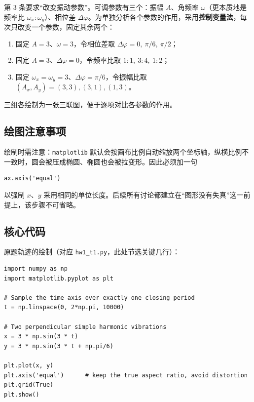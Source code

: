 \documentclass[UTF8,a4paper,12pt]{ctexart}
\begin{document}
第 3 条要求“改变振动参数”。可调参数有三个：振幅 $A$、角频率 $\omega$（更本质地是频率比 $\omega_x:\omega_y$）、相位差 $\Delta\varphi$。为单独分析各个参数的作用，采用\textbf{控制变量法}，每次只改变一个参数，固定其余两个：

\begin{enumerate}
  \item 固定 $A=3$、$\omega=3$，令相位差取 $\Delta\varphi = 0,\ \pi/6,\ \pi/2$；
  \item 固定 $A=3$、$\Delta\varphi=0$，令频率比取 $1{:}1,\ 3{:}4,\ 1{:}2$；
  \item 固定 $\omega_x=\omega_y=3$、$\Delta\varphi=\pi/6$，令振幅比取 $(A_x,A_y)=(3,3),(3,1),(1,3)$。
\end{enumerate}

三组各绘制为一张三联图，便于逐项对比各参数的作用。

\subsection{绘图注意事项}

绘制时需注意：\texttt{matplotlib} 默认会按画布比例自动缩放两个坐标轴，纵横比例不一致时，圆会被压成椭圆、椭圆也会被拉变形。因此必须加一句

\begin{lstlisting}
ax.axis('equal')
\end{lstlisting}

以强制 $x$、$y$ 采用相同的单位长度。后续所有讨论都建立在“图形没有失真”这一前提上，该步骤不可省略。

\subsection{核心代码}

原题轨迹的绘制（对应 \texttt{hw1\_t1.py}，此处节选关键几行）：

\begin{lstlisting}[caption={简谐振动轨迹的绘制（hw1\_t1.py 节选）}]
import numpy as np
import matplotlib.pyplot as plt

# Sample the time axis over exactly one closing period
t = np.linspace(0, 2*np.pi, 10000)

# Two perpendicular simple harmonic vibrations
x = 3 * np.sin(3 * t)
y = 3 * np.sin(3 * t + np.pi/6)

plt.plot(x, y)
plt.axis('equal')      # keep the true aspect ratio, avoid distortion
plt.grid(True)
plt.show()
\end{lstlisting}
\end{document}
